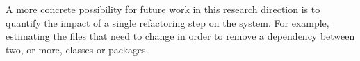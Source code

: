 A more concrete possibility for future work in this research direction is to quantify the impact of a single refactoring step  on the system.
For example, estimating the files that need to change in order to remove a dependency between two, or more, classes or packages.






